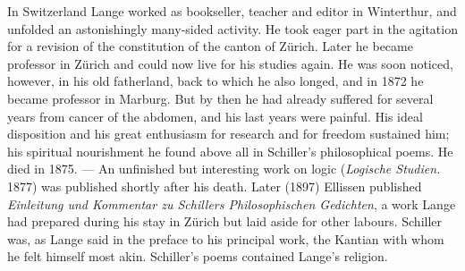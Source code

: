 \documentclass[12pt,a4paper]{book}
\begin{document}
In Switzerland Lange worked as bookseller, teacher and editor in Winterthur, and
unfolded an astonishingly many-sided activity. He took eager part in the
agitation for a revision of the constitution of the canton of Zürich. Later he
became professor in Zürich and could now live for his studies again. He was soon
noticed, however, in his old fatherland, back to which he also longed, and in
1872 he became professor in Marburg. But by then he had already suffered for
several years from cancer of the abdomen, and his last years were painful. His
ideal disposition and his great enthusiasm for research and for freedom sustained
him; his spiritual nourishment he found above all in Schiller's philosophical
poems. He died in 1875. --- An unfinished but interesting work on logic
(\textit{Logische Studien.} 1877) was published shortly after his death. Later
(1897) Ellissen published \textit{Einleitung und Kommentar zu Schillers
Philosophischen Gedichten}, a work Lange had prepared during his stay in Zürich
but laid aside for other labours. Schiller was, as Lange said in the preface to
his principal work, the Kantian with whom he felt himself most akin. Schiller's
poems contained Lange's religion.
\end{document}
